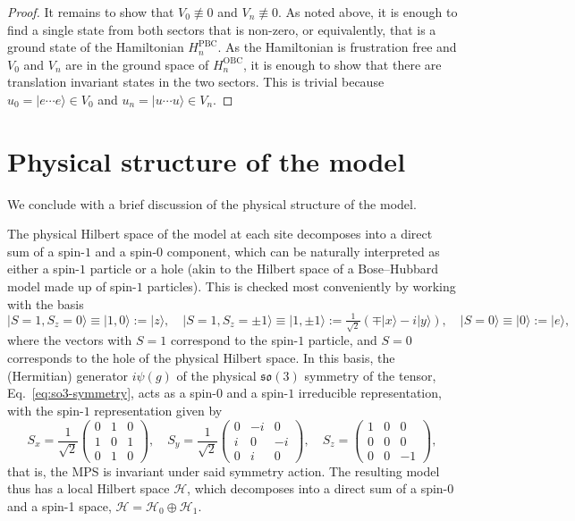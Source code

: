 \documentclass[a4paper]{article}
\newcommand{\ket}[1]{\vert #1 \rangle}
\theoremstyle{definition}
\begin{document}
\begin{proof}
    It remains to show that $V_0\not\equiv 0$ and $V_n\not \equiv 0$. As noted above, it is enough to find a single state from both sectors that is non-zero, or equivalently, that is a ground state of the Hamiltonian $H_n^{\mathrm{PBC}}$. As the Hamiltonian is frustration free and $V_0$ and $V_n$ are in the ground space of $H_n^{\mathrm{OBC}}$, it is enough to show that there are translation invariant states in the two sectors. This is trivial because
    $u_0 = \ket{e\cdots e} \in V_0$  and $u_n = \ket{u\cdots u}\in V_n$.
\end{proof}




\section{Physical structure of the model}\label{sec:physical}

We conclude with a brief discussion of the physical structure of the model.

The physical Hilbert space of the model at each site
decomposes into a direct sum of a spin-$1$ and a spin-$0$ component, which can
be naturally interpreted as either a spin-$1$ particle or a hole
(akin to the Hilbert space of a Bose--Hubbard model made up of spin-$1$ particles).
This is checked most conveniently 
by working with the basis 
\begin{equation*}
\ket{S=1,S_z=0} \equiv \ket{1,0} := \ket{z}, \quad
\ket{S=1,S_z=\pm1} \equiv \ket{1,\pm1}:= \tfrac{1}{\sqrt{2}}(\mp\ket{x}-i\ket{y}), \quad
\ket{S=0} \equiv \ket{0} := \ket{e},
\end{equation*}
where the vectors with $S=1$ correspond to the spin-$1$ particle,  and $S=0$ corresponds to the hole of
the physical Hilbert space. In this basis, the (Hermitian) 
generator $i\psi(g)$ of the  physical  
$\mathfrak{so}(3)$ symmetry of the tensor,
Eq.~\eqref{eq:so3-symmetry}, acts as a spin-$0$ and a spin-$1$ irreducible
representation, with the spin-$1$ representation given by
\begin{equation*}
S_x = \frac{1}{\sqrt{2}}
    \begin{pmatrix} 0 & 1 & 0 \\ 1 & 0 & 1 \\ 0 & 1 & 0 \end{pmatrix}
    ,\quad
S_y = \frac{1}{\sqrt{2}}
    \begin{pmatrix} 0 & -i & 0 \\ i & 0 & -i \\ 0 & i & 0 \end{pmatrix}
    ,\quad
S_z = 
    \begin{pmatrix} 1 & 0 & 0 \\ 0 & 0 & 0 \\ 0 & 0 & -1 \end{pmatrix}
    ,
\end{equation*}
that is, the MPS is invariant under said symmetry action.
The resulting model thus has a local Hilbert space $\mathcal H$, 
which decomposes into a direct sum of a spin-0 and a spin-1 space,
$\mathcal H = \mathcal H_0\oplus \mathcal H_1$.
\end{document}
